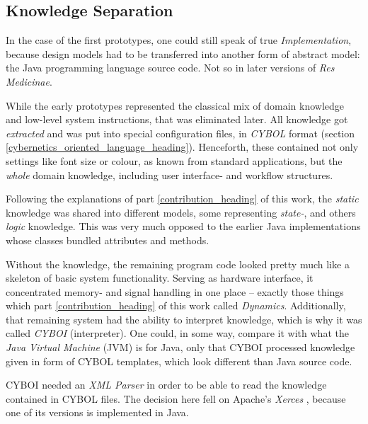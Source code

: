 %
%
%
%
%
%
%

\subsection{Knowledge Separation}
\label{knowledge_separation_heading}

In the case of the first prototypes, one could still speak of true
\emph{Implementation}, because design models had to be transferred into another
form of abstract model: the Java programming language source code. Not so in
later versions of \emph{Res Medicinae}.

While the early prototypes represented the classical mix of domain knowledge
and low-level system instructions, that was eliminated later. All knowledge got
\emph{extracted} and was put into special configuration files, in \emph{CYBOL}
format (section \ref{cybernetics_oriented_language_heading}). Henceforth, these
contained not only settings like font size or colour, as known from standard
applications, but the \emph{whole} domain knowledge, including user interface-
and workflow structures.

Following the explanations of part \ref{contribution_heading} of this work, the
\emph{static} knowledge was shared into different models, some representing
\emph{state-}, and others \emph{logic} knowledge. This was very much opposed to
the earlier Java implementations whose classes bundled attributes and methods.

Without the knowledge, the remaining program code looked pretty much like a
skeleton of basic system functionality. Serving as hardware interface, it
concentrated memory- and signal handling in one place -- exactly those things
which part \ref{contribution_heading} of this work called \emph{Dynamics}.
Additionally, that remaining system had the ability to interpret knowledge,
which is why it was called \emph{CYBOI} (interpreter). One could, in some way,
compare it with what the \emph{Java Virtual Machine} (JVM) is for Java, only
that CYBOI processed knowledge given in form of CYBOL templates, which look
different than Java source code.

CYBOI needed an \emph{XML Parser} in order to be able to read the knowledge
contained in CYBOL files. The decision here fell on Apache's \emph{Xerces}
\cite{xerces}, because one of its versions is implemented in Java.
